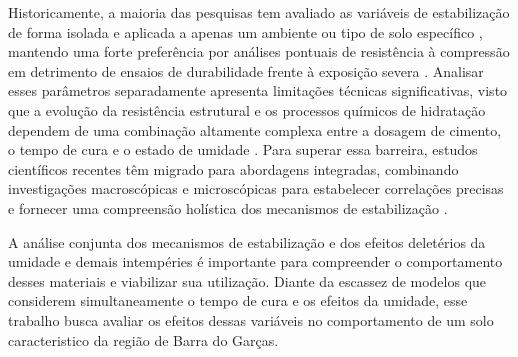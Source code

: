 
Historicamente, a maioria das pesquisas tem avaliado as variáveis de estabilização de forma isolada e aplicada a apenas um ambiente ou tipo de solo específico , mantendo uma forte preferência por análises pontuais de resistência à compressão em detrimento de ensaios de durabilidade frente à exposição severa \cite{Khunaprapakorn2025, Junior2024}. Analisar esses parâmetros separadamente apresenta limitações técnicas significativas, visto que a evolução da resistência estrutural e os processos químicos de hidratação dependem de uma combinação altamente complexa entre a dosagem de cimento, o tempo de cura e o estado de umidade \cite{Abdallah2023}. Para superar essa barreira, estudos científicos recentes têm migrado para abordagens integradas, combinando investigações macroscópicas e microscópicas para estabelecer correlações precisas e fornecer uma compreensão holística dos mecanismos de estabilização \cite{Yang2024}. %


A análise conjunta dos mecanismos de estabilização e dos efeitos deletérios da umidade e demais intempéries é importante para compreender o comportamento desses materiais e viabilizar sua utilização. Diante da escassez de modelos que considerem simultaneamente o tempo de cura e os efeitos da umidade, esse trabalho busca avaliar os efeitos dessas variáveis no comportamento de um solo caracteristico da região de Barra do Garças.

